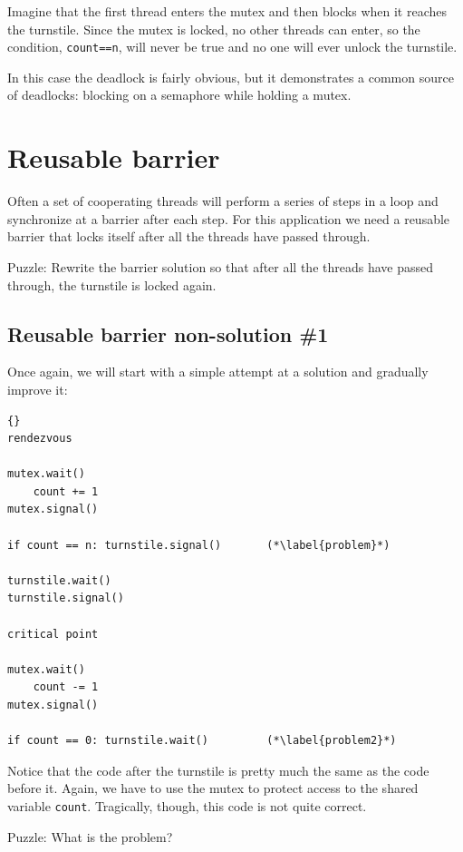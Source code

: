 \documentclass{book}
\begin{document}
Imagine that the first thread enters the
mutex and then blocks when it reaches the turnstile.
Since the mutex is locked, no other threads can enter,
so the condition, {\tt count==n}, will never be true and
no one will ever unlock the turnstile.

In this case the deadlock is fairly obvious, but it
demonstrates a
common source of deadlocks: blocking on a semaphore while
holding a mutex.


\section {Reusable barrier}
\label{rebar}

Often a set of cooperating threads will perform a series of steps
in a loop and synchronize at a barrier after each step.  For this
application we need a reusable barrier that locks itself after
all the threads have passed through.

Puzzle: Rewrite the barrier solution so that after all the threads
have passed through, the turnstile is locked again.



\subsection {Reusable barrier non-solution \#1}

Once again, we will start with a simple attempt at a solution
and gradually improve it:

\begin{lstlisting}[title={Reusable barrier non-solution}]{}
rendezvous

mutex.wait()
    count += 1
mutex.signal()

if count == n: turnstile.signal()       (*\label{problem}*)

turnstile.wait()
turnstile.signal()

critical point

mutex.wait()
    count -= 1
mutex.signal()

if count == 0: turnstile.wait()         (*\label{problem2}*)
\end{lstlisting}

Notice that the code after the turnstile is pretty much the same as
the code before it.  Again, we have to use the mutex to protect access
to the shared variable {\tt count}.
Tragically, though, this code is not quite correct.

Puzzle: What is the problem?
\end{document}
